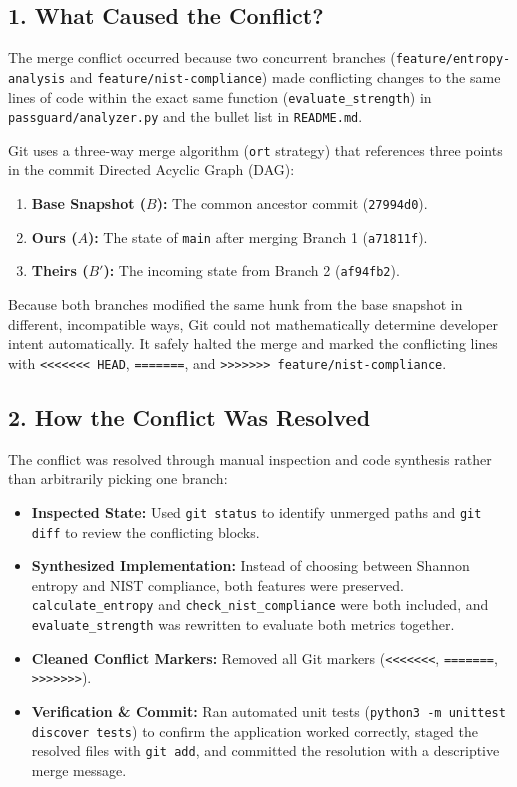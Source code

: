 \documentclass[11pt,a4paper]{article}
\begin{document}
\subsection{1. What Caused the Conflict?}
The merge conflict occurred because two concurrent branches (\texttt{feature/entropy-analysis} and \texttt{feature/nist-compliance}) made conflicting changes to the same lines of code within the exact same function (\texttt{evaluate\_strength}) in \texttt{passguard/analyzer.py} and the bullet list in \texttt{README.md}.

Git uses a three-way merge algorithm (\texttt{ort} strategy) that references three points in the commit Directed Acyclic Graph (DAG):
\begin{enumerate}
    \item \textbf{Base Snapshot ($B$):} The common ancestor commit (\texttt{27994d0}).
    \item \textbf{Ours ($A$):} The state of \texttt{main} after merging Branch 1 (\texttt{a71811f}).
    \item \textbf{Theirs ($B'$):} The incoming state from Branch 2 (\texttt{af94fb2}).
\end{enumerate}
Because both branches modified the same hunk from the base snapshot in different, incompatible ways, Git could not mathematically determine developer intent automatically. It safely halted the merge and marked the conflicting lines with \texttt{<<<<<<< HEAD}, \texttt{=======}, and \texttt{>>>>>>> feature/nist-compliance}.

\subsection{2. How the Conflict Was Resolved}
The conflict was resolved through manual inspection and code synthesis rather than arbitrarily picking one branch:
\begin{itemize}
    \item \textbf{Inspected State:} Used \texttt{git status} to identify unmerged paths and \texttt{git diff} to review the conflicting blocks.
    \item \textbf{Synthesized Implementation:} Instead of choosing between Shannon entropy and NIST compliance, both features were preserved. \texttt{calculate\_entropy} and \texttt{check\_nist\_compliance} were both included, and \texttt{evaluate\_strength} was rewritten to evaluate both metrics together.
    \item \textbf{Cleaned Conflict Markers:} Removed all Git markers (\texttt{<<<<<<<}, \texttt{=======}, \texttt{>>>>>>>}).
    \item \textbf{Verification \& Commit:} Ran automated unit tests (\texttt{python3 -m unittest discover tests}) to confirm the application worked correctly, staged the resolved files with \texttt{git add}, and committed the resolution with a descriptive merge message.
\end{itemize}
\end{document}
